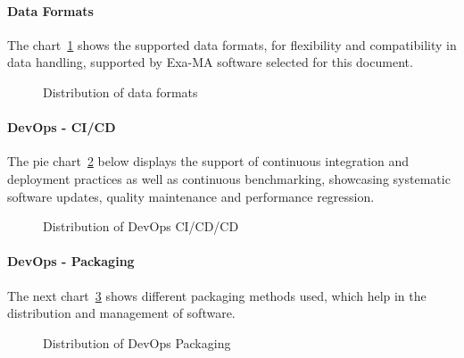         \paragraph{Data Formats}
        The chart~\ref{fig:data} shows the supported data formats, for flexibility and compatibility in data handling, supported by Exa-MA software selected for this document.
        \begin{figure}[H]
\centering
{}
\caption{Distribution of data formats}
\label{fig:data}
\end{figure}

        \paragraph{DevOps - CI/CD}
        The pie chart~\ref{fig:devops-cicd} below displays the support of continuous integration and deployment practices as well as continuous benchmarking, showcasing systematic software updates, quality maintenance and performance regression.
        \begin{figure}[H]
\centering
{}
\caption{Distribution of DevOps CI/CD/CD}
\label{fig:devops-cicd}
\end{figure}

        \paragraph{DevOps - Packaging}
        The next chart~\ref{fig:devops-packaging} shows different packaging methods used, which help in the distribution and management of software.
        \begin{figure}[H]
\centering
{}
\caption{Distribution of DevOps Packaging}
\label{fig:devops-packaging}
\end{figure}

